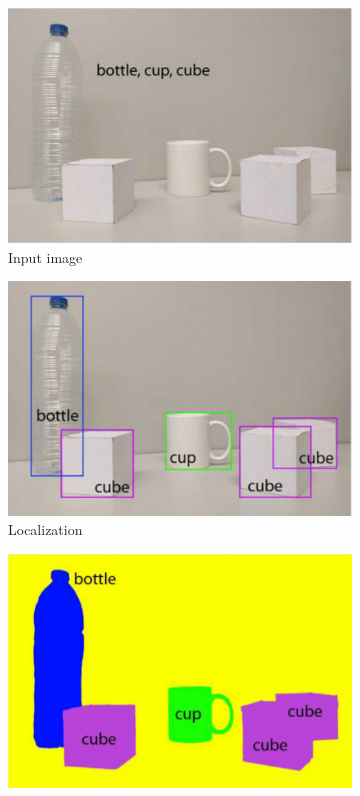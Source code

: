 \begin{figure}
  \begin{subfigure}[b]{0.45\textwidth}
    \includegraphics[width=\linewidth]{Images/Background/s1.png}
    \caption{Input image}
    \label{fig:input_img}
  \end{subfigure}
\hfill
  \begin{subfigure}[b]{0.45\textwidth}
    \includegraphics[width=\linewidth]{Images/Background/s2.png}
    \caption{Localization}
    \label{fig:localization}
  \end{subfigure}
  \begin{subfigure}[b]{0.45\textwidth}
    \includegraphics[width=\linewidth]{Images/Background/s3.png}

\end{subfigure}
\end{figure}
